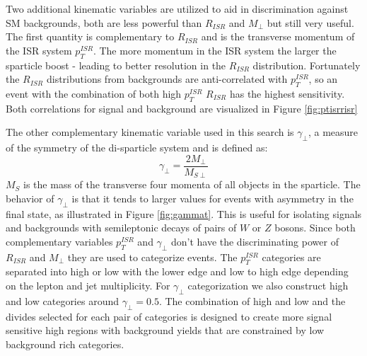 Two additional kinematic variables are utilized to aid in discrimination against SM backgrounds, both are less powerful than $R_{ISR}$ and $M_\perp$ but still very useful. The first quantity is complementary to $R_{ISR}$ and is the transverse momentum of the ISR system $p_T^{ISR}$. The more momentum in the ISR system the larger the sparticle boost - leading to better resolution in the $R_{ISR}$ distribution. Fortunately the $R_{ISR}$ distributions from backgrounds are anti-correlated with $p_T^{ISR}$, so an event with the combination of both high  $p_T^{ISR}$ $R_{ISR}$ has the highest sensitivity. Both correlations for signal and background are visualized in Figure \ref{fig:ptisrrisr}


 The other complementary kinematic variable used in this search is $\gamma_\perp$,  a measure of the symmetry of the di-sparticle system and is defined as:
\begin{equation}
\gamma_\perp = \frac{2M_\perp}{M_{S\perp}}
\end{equation}
$M_S$ is the mass of the transverse four momenta of all objects in the sparticle. The behavior of $\gamma_\perp$ is that it tends to larger values for events with asymmetry in the final state, as illustrated in Figure \ref{fig:gammat}. This is useful for isolating signals and backgrounds with semileptonic decays of pairs of $W$ or $Z$ bosons. Since both complementary variables $p_T^{ISR}$ and $\gamma_\perp$ don't have the discriminating power of $R_{ISR}$ and $M_\perp$ they are used to categorize events. The $p_T^{ISR}$ categories are separated into high or low with the lower edge and low to high edge depending on the lepton and jet multiplicity. For $\gamma_\perp$ categorization we also construct high and low categories around $\gamma_\perp= 0.5$. The combination of high and low and the divides selected for each pair of categories is designed to create more signal sensitive high regions with background yields that are constrained by low background rich categories.

  


